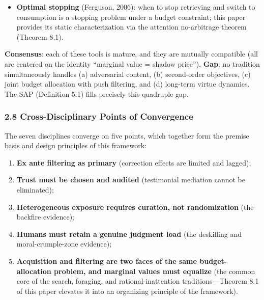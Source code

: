 \documentclass[
  11pt]{article}
\providecommand{\tightlist}{%
  \setlength{\itemsep}{0pt}\setlength{\parskip}{0pt}}
\begin{document}
\begin{itemize}
  a query equals the expected information gain (EIG); under
  conditionally independent observations, EIG is monotone and submodular
  in the query set (Krause, Singh \& Guestrin, 2008), and greedy
  selection achieves the \((1-1/e)\) guarantee (Theorem 8.2). Within
  SEA, DeGroot's criterion operates under an attention budget and
  against a declared \(g^{(2)}\), with the Pandora index (Weitzman,
  1979) as its frozen-box special case (§8.6).
\item
  \textbf{Optimal stopping} (Ferguson, 2006): when to stop retrieving
  and switch to consumption is a stopping problem under a budget
  constraint; this paper provides its static characterization via the
  attention no-arbitrage theorem (Theorem 8.1).
\end{itemize}

\textbf{Consensus}: each of these tools is mature, and they are mutually
compatible (all are centered on the identity ``marginal value = shadow
price''). \textbf{Gap}: no tradition simultaneously handles (a)
adversarial content, (b) second-order objectives, (c) joint budget
allocation with push filtering, and (d) long-term virtue dynamics. The
SAP (Definition 5.1) fills precisely this quadruple gap.

\subsubsection{2.8 Cross-Disciplinary Points of
Convergence}\label{cross-disciplinary-points-of-convergence}

The seven disciplines converge on five points, which together form the
premise basis and design principles of this framework:

\begin{enumerate}
\def\labelenumi{\arabic{enumi}.}
\tightlist
\item
  \textbf{Ex ante filtering as primary} (correction effects are limited
  and lagged);
\item
  \textbf{Trust must be chosen and audited} (testimonial mediation
  cannot be eliminated);
\item
  \textbf{Heterogeneous exposure requires curation, not randomization}
  (the backfire evidence);
\item
  \textbf{Humans must retain a genuine judgment load} (the deskilling
  and moral-crumple-zone evidence);
\item
  \textbf{Acquisition and filtering are two faces of the same
  budget-allocation problem, and marginal values must equalize} (the
  common core of the search, foraging, and rational-inattention
  traditions---Theorem 8.1 of this paper elevates it into an organizing
  principle of the framework).
\end{enumerate}
\end{document}
